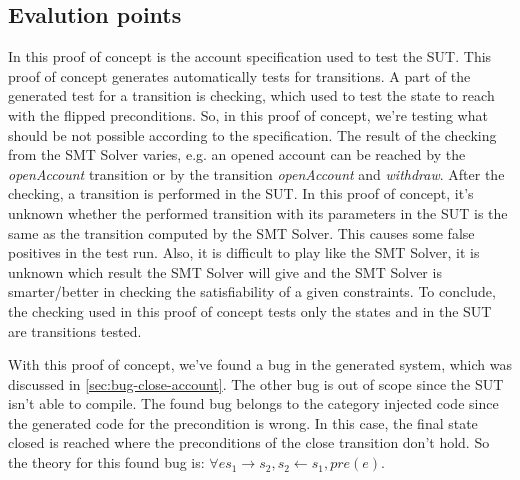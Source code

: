 \subsection{Evalution points}
In this proof of concept is the account specification used to test the SUT.
This proof of concept generates automatically tests for transitions. A part of
the generated test for a transition is checking, which used to test the state to
reach with the flipped preconditions. So, in this proof of concept, we're
testing what should be not possible according to the specification. The result
of the checking from the SMT Solver varies, e.g. an opened account can be
reached by the \textit{openAccount} transition or by the transition
\textit{openAccount} and \textit{withdraw}. After the checking, a transition
is performed in the SUT. In this proof of concept, it's unknown whether the
performed transition with its parameters in the SUT is the same as the
transition computed by the SMT Solver. This causes some false positives in the
test run. Also, it is difficult to play like the SMT Solver, it is unknown which
result the SMT Solver will give and the SMT Solver is smarter/better in checking
the satisfiability of a given constraints. To conclude, the checking used in
this proof of concept tests only the states and in the SUT are transitions
tested.

With this proof of concept, we've found a bug in the generated system, which was
discussed in \autoref{sec:bug-close-account}. The other bug is out of scope
since the SUT isn't able to compile. The found bug belongs to the category
injected code since the generated code for the precondition is wrong. In this
case, the final state closed is reached where the preconditions of the close
transition don't hold. So the theory for this found bug is:
$\forall e s_{1} \to s_{2}, s_{2} \gets s_{1}, pre(e)$.




